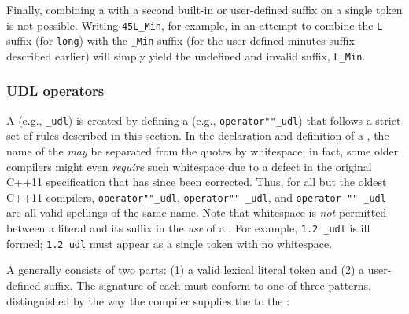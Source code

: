 \noindent Finally, combining a  with a
second built-in or user-defined suffix on a single token is not possible. Writing
\lstinline!45L_Min!, for example, in an attempt to combine the \lstinline!L!
suffix (for \lstinline!long!) with the \lstinline!_Min! suffix (for the
user-defined minutes suffix described earlier) will
simply yield the undefined and invalid suffix, \lstinline!L_Min!.

\subsubsection[UDL operators]{UDL operators}\label{user-defined-literal-(udl)-operators}

A  (e.g., \lstinline!_udl!) is created by defining a
 (e.g., \lstinline!operator""_udl!) that follows a
strict set of rules described in this section. In the declaration and
definition of a , the name of the  \emph{may} be separated from the quotes by whitespace; in fact,
some older compilers might even \emph{require} such whitespace due to a
defect in the original C++11 specification that has since been
corrected. Thus, for all but the oldest C++11 compilers,
\lstinline!operator""_udl!, \lstinline!operator""!~\lstinline!_udl!, and
\lstinline!operator!~\lstinline!""!~\lstinline!_udl! are all valid spellings of
the same  name. Note that whitespace is \emph{not}
permitted between a literal and its suffix in the \emph{use} of a
. For example, \lstinline!1.2!~\lstinline!_udl! is ill formed;
\lstinline!1.2_udl! must appear as a single token with no whitespace.

A  generally consists of two parts: (1) a valid lexical
literal token and (2) a user-defined suffix. The signature of each
 must conform to one of three patterns,
distinguished by the way the compiler supplies the  to the :

